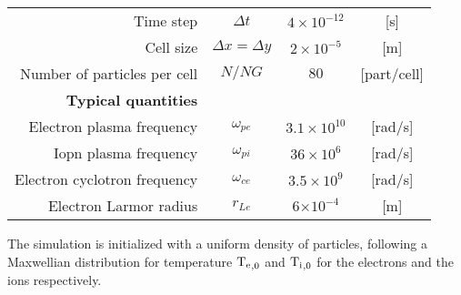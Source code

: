\begin{table}[htbp]
\begin{tabular}{@{}r c c c@{}}
          Time step & $\Delta t  $                      & $4 \times 10^{-12}$ & [{s}] \\
          Cell size & $\Delta x = \Delta y$ & $2 \times 10^{-5}$  & [{m}] \\
          Number of particles per cell & $N/NG      $                      & $80$                & [{part/cell}] \\
          \midrule
          {\bf Typical quantities} &  &  &  \\ 
          Electron plasma frequency & $\omega_{pe}$               & $3.1 \times 10^{10} $  & [rad/s]\\
          Iopn plasma frequency & $\omega_{pi}$               & $36 \times 10^{6} $  & [rad/s]\\
          Electron cyclotron frequency & $\omega_{ce}$               &  $3.5\times 10^{9}$  & [rad/s] \\
          Electron Larmor radius & $r_{Le}$                    & 6$\times 10^{-4}$    & [m] \\
          \bottomrule
       \end{tabular}
    \end{table}
  
  
  The simulation is initialized with a uniform density of particles, following a Maxwellian distribution for temperature $\mathrm{T_e}_{,0}$ and $\mathrm{T_i}_{,0}$ for the electrons and the ions respectively.
  
  
